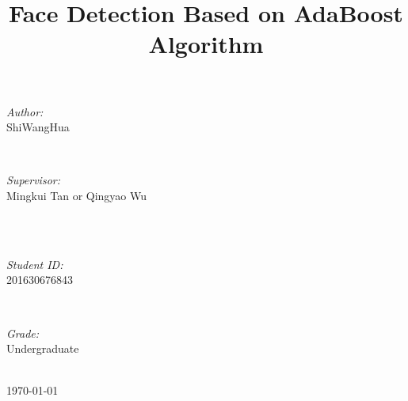 \documentclass[journal, a4paper]{IEEEtran}
\begin{document}
\begin{titlepage}
\begin{minipage}{0.4\textwidth}
\begin{flushleft} \large
\emph{Author:}\\
ShiWangHua %
\end{flushleft}
\end{minipage}
~
\begin{minipage}{0.4\textwidth}
\begin{flushright} \large
\emph{Supervisor:} \\
Mingkui Tan or Qingyao Wu %
\end{flushright}
\end{minipage}\\[2cm]
~
\begin{minipage}{0.4\textwidth}
\begin{flushleft} \large
\emph{Student ID:}\\
201630676843
\end{flushleft}
\end{minipage}
~
\begin{minipage}{0.4\textwidth}
\begin{flushright} \large
\emph{Grade:} \\
Undergraduate 
\end{flushright}
\end{minipage}\\[2cm]



{\large \today}\\[2cm] %

 

\vfill %

\end{titlepage}

	\title{Face Detection Based on AdaBoost Algorithm}
	\maketitle
\end{document}
